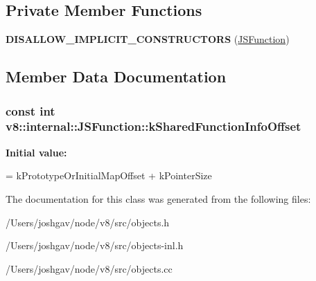 \subsection*{Private Member Functions}
\begin{DoxyCompactItemize}
\item 
{\bfseries D\+I\+S\+A\+L\+L\+O\+W\+\_\+\+I\+M\+P\+L\+I\+C\+I\+T\+\_\+\+C\+O\+N\+S\+T\+R\+U\+C\+T\+O\+RS} (\hyperlink{classv8_1_1internal_1_1_j_s_function}{J\+S\+Function})\hypertarget{classv8_1_1internal_1_1_j_s_function_aee6ab4edb727e49b13d47ede645e9fc8}{}\label{classv8_1_1internal_1_1_j_s_function_aee6ab4edb727e49b13d47ede645e9fc8}

\end{DoxyCompactItemize}


\subsection{Member Data Documentation}
\subsubsection[{\texorpdfstring{k\+Shared\+Function\+Info\+Offset}{kSharedFunctionInfoOffset}}]{\setlength{\rightskip}{0pt plus 5cm}const int v8\+::internal\+::\+J\+S\+Function\+::k\+Shared\+Function\+Info\+Offset\hspace{0.3cm}{\ttfamily [static]}}\hypertarget{classv8_1_1internal_1_1_j_s_function_aad0f7708bd719c7d19f45468d23e8ccd}{}\label{classv8_1_1internal_1_1_j_s_function_aad0f7708bd719c7d19f45468d23e8ccd}
{\bfseries Initial value\+:}
\begin{DoxyCode}
=
      kPrototypeOrInitialMapOffset + kPointerSize
\end{DoxyCode}


The documentation for this class was generated from the following files\+:\begin{DoxyCompactItemize}
\item 
/\+Users/joshgav/node/v8/src/objects.\+h\item 
/\+Users/joshgav/node/v8/src/objects-\/inl.\+h\item 
/\+Users/joshgav/node/v8/src/objects.\+cc\end{DoxyCompactItemize}
